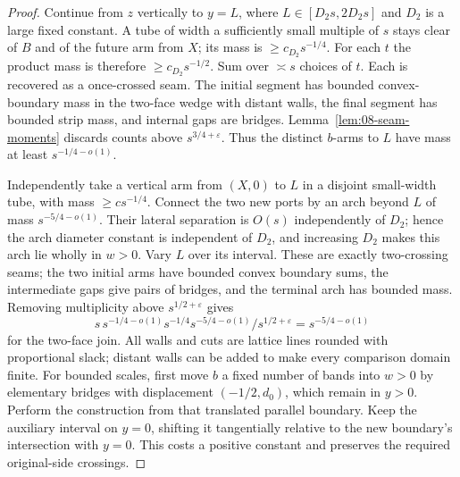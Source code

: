 \begin{proof}
Continue from \(z\) vertically to \(y=L\), where
\(L\in[D_2s,2D_2s]\) and \(D_2\) is a large fixed constant. A tube
of width a sufficiently small multiple of \(s\) stays clear of \(B\)
and of the future arm from \(X\); its mass is
\(\ge c_{D_2}s^{-1/4}\). For each \(t\) the product mass is therefore
\(\ge c_{D_2}s^{-1/2}\). Sum over \(\asymp s\) choices of \(t\).
Each is recovered as a once-crossed seam. The initial segment has bounded
convex-boundary mass in the two-face wedge with distant walls, the final
segment has bounded strip mass, and internal gaps are bridges.
Lemma~\ref{lem:08-seam-moments} discards counts above
\(s^{3/4+\varepsilon}\). Thus the distinct \(b\)-arms to \(L\) have
mass at least \(s^{-1/4-o(1)}\).

Independently take a vertical arm from \((X,0)\) to \(L\) in a disjoint
small-width tube, with mass \(\ge cs^{-1/4}\). Connect the two new ports
by an arch beyond \(L\) of mass \(s^{-5/4-o(1)}\). Their lateral
separation is \(O(s)\) independently of \(D_2\); hence the arch diameter
constant is independent of \(D_2\), and increasing \(D_2\) makes this
arch lie wholly in \(w>0\). Vary \(L\) over its interval. These are
exactly two-crossing seams; the two initial arms have bounded convex
boundary sums, the intermediate gaps give pairs of bridges, and the
terminal arch has bounded mass. Removing multiplicity above
\(s^{1/2+\varepsilon}\) gives
\[
 s\,s^{-1/4-o(1)}s^{-1/4}s^{-5/4-o(1)}
       /s^{1/2+\varepsilon}=s^{-5/4-o(1)}
\]
for the two-face join. All walls and cuts are lattice lines rounded with
proportional slack; distant walls can be added to make every comparison
domain finite. For bounded scales, first move \(b\) a fixed number of
bands into \(w>0\) by elementary bridges with displacement
\((-1/2,d_0)\), which remain in \(y>0\). Perform the construction from
that translated parallel boundary. Keep the auxiliary interval on
$y=0$, shifting it tangentially relative to the new boundary's
intersection with $y=0$. This costs a positive constant and preserves the
required original-side crossings.


\end{proof}
